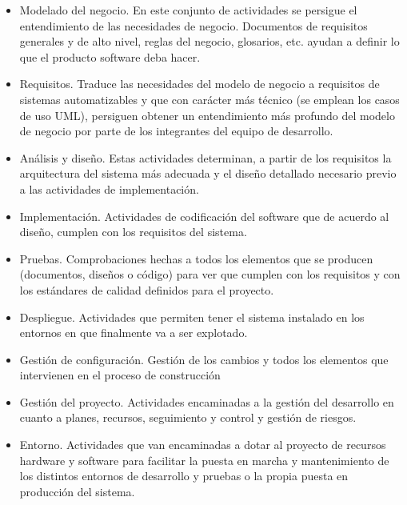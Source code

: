 \begin{itemize}
\begin{itemize}
\item Modelado del negocio. En este conjunto de actividades se persigue el entendimiento de las necesidades de negocio. Documentos de requisitos generales y de alto nivel, reglas del negocio, glosarios, etc. ayudan a definir lo que el producto software deba hacer.
\item Requisitos. Traduce las necesidades del modelo de negocio a requisitos de sistemas automatizables y que con carácter más técnico (se emplean los casos de uso UML), persiguen obtener un entendimiento más profundo del modelo de negocio por parte de los integrantes del equipo de desarrollo.
\item Análisis y diseño. Estas actividades determinan, a partir de los requisitos la arquitectura del sistema más adecuada y el diseño detallado necesario previo a las actividades de implementación.
\item Implementación. Actividades de codificación del software que de acuerdo al diseño, cumplen con los requisitos del sistema.
\item Pruebas. Comprobaciones hechas a todos los elementos que se producen (documentos, diseños o código) para ver que cumplen con los requisitos y con los estándares de calidad definidos para el proyecto.
\item Despliegue. Actividades que permiten tener el sistema instalado en los entornos en que finalmente va a ser explotado.
\item Gestión de configuración. Gestión de los cambios y todos los elementos que intervienen en el proceso de construcción
\item Gestión del proyecto. Actividades encaminadas a la gestión del desarrollo en cuanto a planes, recursos, seguimiento y control y gestión de riesgos.
\item Entorno. Actividades que van encaminadas a dotar al proyecto de recursos hardware y software para facilitar la puesta en marcha y mantenimiento de los distintos entornos de desarrollo y pruebas o la propia puesta en producción del sistema.
\end{itemize}


\end{itemize}
